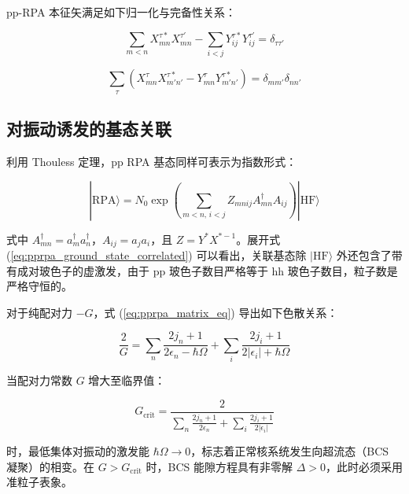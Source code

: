 pp-RPA 本征矢满足如下归一化与完备性关系：

\begin{equation}
\sum_{m<n}X^{\tau*}_{mn}X^{\tau'}_{mn}-\sum_{i<j}Y^{\tau*}_{ij}Y^{\tau'}_{ij}=\delta_{\tau\tau'}\label{eq:pprpa_orthonormality}
\end{equation}

\begin{equation}
\sum_{\tau}\left(X^{\tau}_{mn}X^{\tau*}_{m'n'}-Y^{\tau}_{mn}Y^{\tau*}_{m'n'}\right)=\delta_{mm'}\delta_{nn'}\label{eq:pprpa_closure}
\end{equation}


\subsection{对振动诱发的基态关联\label{subsec:8.8.2_=005BF9=00632F=0052A8=008BF1=0053D1=007684=0057FA=006001=005173=008054}}

利用 Thouless 定理，pp RPA 基态同样可表示为指数形式：

\begin{equation}
|\text{RPA}\rangle=N_{0}\exp\left(\sum_{m<n,\,i<j}Z_{mnij}A^{\dagger}_{mn}A_{ij}\right)|\text{HF}\rangle\label{eq:pprpa_ground_state_correlated}
\end{equation}

式中 $A^{\dagger}_{mn}=a^{\dagger}_{m}a^{\dagger}_{n}$，$A_{ij}=a_{j}a_{i}$，且
$Z=Y^{*}X^{*-1}$。展开式 (\ref{eq:pprpa_ground_state_correlated}) 可以看出，关联基态除
$|\text{HF}\rangle$ 外还包含了带有成对玻色子的虚激发，由于 pp 玻色子数目严格等于 hh 玻色子数目，粒子数是严格守恒的。

对于纯配对力 $-G$，式 (\ref{eq:pprpa_matrix_eq}) 导出如下色散关系：

\begin{equation}
\frac{2}{G}=\sum_{n}\frac{2j_{n}+1}{2\epsilon_{n}-\hbar\Omega}+\sum_{i}\frac{2j_{i}+1}{2|\epsilon_{i}|+\hbar\Omega}\label{eq:pprpa_pairing_dispersion}
\end{equation}

当配对力常数 $G$ 增大至临界值：

\begin{equation}
G_{\text{crit}}=\frac{2}{\sum_{n}\frac{2j_{n}+1}{2\epsilon_{n}}+\sum_{i}\frac{2j_{i}+1}{2|\epsilon_{i}|}}\label{eq:pprpa_gcrit_def}
\end{equation}

时，最低集体对振动的激发能 $\hbar\Omega\to0$，标志着正常核系统发生向超流态（BCS 凝聚）的相变。在 $G>G_{\text{crit}}$
时，BCS 能隙方程具有非零解 $\Delta>0$，此时必须采用准粒子表象。

